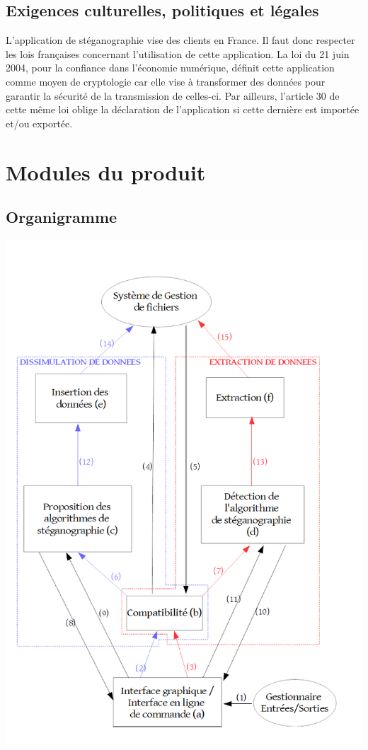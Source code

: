\documentclass[11pt]{article}
\begin{document}
\subsection{Exigences culturelles, politiques et légales}
L'application de stéganographie vise des clients en France. Il faut donc respecter les lois françaises concernant l'utilisation de cette application. 
La loi du 21 juin 2004, pour la confiance dans l'économie numérique, définit cette application comme moyen de cryptologie car elle vise à transformer des données pour garantir la sécurité de la transmission de celles-ci. 
Par ailleurs, l'article 30 de cette même loi oblige la déclaration de l'application si cette dernière est importée et/ou exportée. 

\newpage

\section{Modules du produit}

\subsection{Organigramme}

\hspace{1cm}
\includegraphics[scale=0.55]{organigramme.png}
\end{document}
